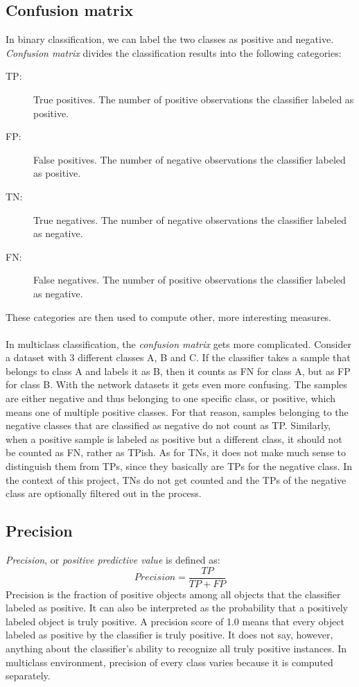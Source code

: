 \documentclass{article}
\begin{document}
    \subsection{Confusion matrix}
      In binary classification, we can label the two classes as positive and negative. {\it Confusion matrix} divides the classification results into the following categories:
      \begin{description}
      \item [TP:] True positives. The number of positive observations the classifier labeled as positive.
      \item [FP:] False positives. The number of negative observations the classifier labeled as positive.
      \item [TN:] True negatives. The number of negative observations the classifier labeled as negative.
      \item [FN:] False negatives. The number of positive observations the classifier labeled as negative.
      \end{description}
      These categories are then used to compute other, more interesting measures.
      \\~\\
      In multiclass classification, the {\it confusion matrix} gets more complicated. Consider a dataset with 3 different classes A, B and C. If the classifier takes a sample that belongs to class A and labels it as B, then it counts as FN for class A, but as FP for class B. With the network datasets it gets even more confusing. The samples are either negative and thus belonging to one specific class, or positive, which means one of multiple positive classes. For that reason, samples belonging to the negative classes that are classified as negative do not count as TP. Similarly, when a positive sample is labeled as positive but a different class, it should not be counted as FN, rather as TPish. As for TNs, it does not make much sense to distinguish them from TPs, since they basically are TPs for the negative class. In the context of this project, TNs do not get counted and the TPs of the negative class are optionally filtered out in the process.
    \newpage
    \subsection{Precision}
      {\it Precision}, or {\it positive predictive value} is defined as:
      \begin{displaymath}
        Precision = \frac{TP}{TP + FP}
      \end{displaymath}
      Precision is the fraction of positive objects among all objects that the classifier labeled as positive. It can also be interpreted as the probability that a positively labeled object is truly positive. A precision score of 1.0 means that every object labeled as positive by the classifier is truly positive. It does not say, however, anything about the classifier's ability to recognize all truly positive instances. In multiclass environment, precision of every class varies because it is computed separately.
\end{document}

